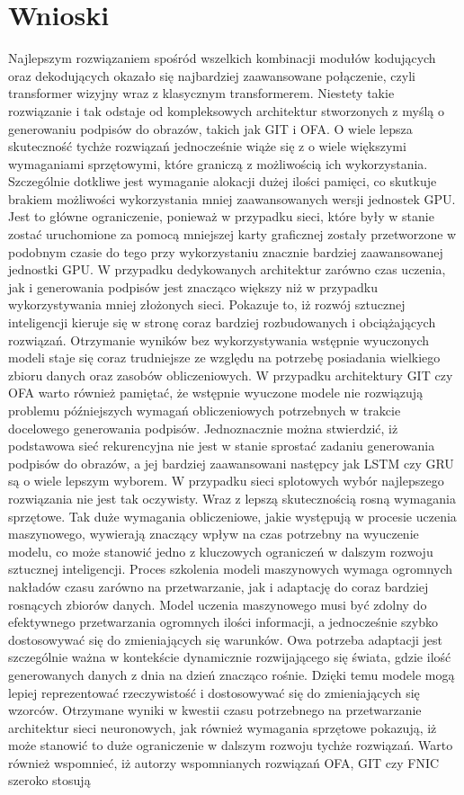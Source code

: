 \newpage %
\section{Wnioski}
Najlepszym rozwiązaniem spośród wszelkich kombinacji modułów kodujących oraz dekodujących okazało się najbardziej zaawansowane połączenie, czyli transformer wizyjny wraz z klasycznym transformerem. Niestety takie rozwiązanie i tak odstaje od kompleksowych architektur stworzonych z myślą o generowaniu podpisów do obrazów, takich jak GIT i OFA. O wiele lepsza skuteczność tychże rozwiązań jednocześnie wiąże się z o wiele większymi wymaganiami sprzętowymi, które graniczą z możliwością ich wykorzystania. Szczególnie dotkliwe jest wymaganie alokacji dużej ilości pamięci, co skutkuje brakiem możliwości wykorzystania mniej zaawansowanych wersji jednostek GPU. Jest to główne ograniczenie, ponieważ w przypadku sieci, które były w stanie zostać uruchomione za pomocą mniejszej karty graficznej zostały przetworzone w podobnym czasie do tego przy wykorzystaniu znacznie bardziej zaawansowanej jednostki GPU. W przypadku dedykowanych architektur zarówno czas uczenia, jak i generowania podpisów jest znacząco większy niż w przypadku wykorzystywania mniej złożonych sieci. Pokazuje to, iż rozwój sztucznej inteligencji kieruje się w stronę coraz bardziej rozbudowanych i obciążających rozwiązań. Otrzymanie wyników bez wykorzystywania wstępnie wyuczonych modeli staje się coraz trudniejsze ze względu na potrzebę posiadania wielkiego zbioru danych oraz zasobów obliczeniowych. W przypadku architektury GIT czy OFA warto również pamiętać, że wstępnie wyuczone modele nie rozwiązują problemu późniejszych wymagań obliczeniowych potrzebnych w trakcie docelowego generowania podpisów. Jednoznacznie można stwierdzić, iż podstawowa sieć rekurencyjna nie jest w stanie sprostać zadaniu generowania podpisów do obrazów, a jej bardziej zaawansowani następcy jak LSTM czy GRU są o wiele lepszym wyborem. W przypadku sieci splotowych wybór najlepszego rozwiązania nie jest tak oczywisty. Wraz z lepszą skutecznością rosną wymagania sprzętowe. Tak duże wymagania obliczeniowe, jakie występują w procesie uczenia maszynowego, wywierają znaczący wpływ na czas potrzebny na wyuczenie modelu, co może stanowić jedno z kluczowych ograniczeń w dalszym rozwoju sztucznej inteligencji. Proces szkolenia modeli maszynowych wymaga ogromnych nakładów czasu zarówno na przetwarzanie, jak i adaptację do coraz bardziej rosnących zbiorów danych. Model uczenia maszynowego musi być zdolny do efektywnego przetwarzania ogromnych ilości informacji, a jednocześnie szybko dostosowywać się do zmieniających się warunków. Owa potrzeba adaptacji jest szczególnie ważna w kontekście dynamicznie rozwijającego się świata, gdzie ilość generowanych danych z dnia na dzień znacząco rośnie. Dzięki temu modele mogą lepiej reprezentować rzeczywistość i dostosowywać się do zmieniających się wzorców. Otrzymane wyniki w kwestii czasu potrzebnego na przetwarzanie architektur sieci neuronowych, jak również wymagania sprzętowe pokazują, iż może stanowić to duże ograniczenie w dalszym rozwoju tychże rozwiązań. Warto również wspomnieć, iż autorzy wspomnianych rozwiązań OFA, GIT czy FNIC szeroko stosują 